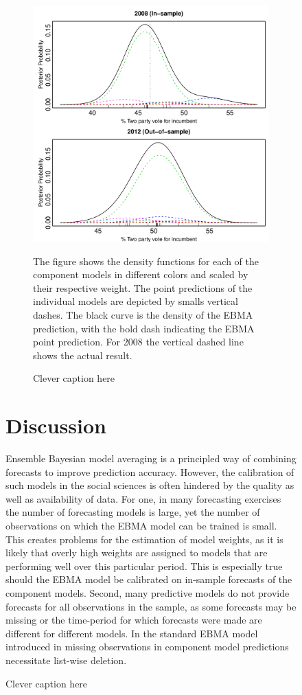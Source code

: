 \documentclass[12pt,fullpage,endnotes]{article}
\begin{document}
\begin{figure}[h]
\begin{figure}[h]
\caption{Clever caption here}
\label{pres}
\begin{center}
\includegraphics[scale=.8]{presForecast}
\end{center}
The figure shows the density functions for each of the component
models in different colors and scaled by their respective weight. The
point predictions of the individual models are depicted by smalls
vertical dashes. The black curve is the density of the EBMA
prediction, with the bold dash indicating the EBMA point
prediction. For 2008 the vertical dashed line shows the actual result.
\end{figure}


\section{Discussion} 
Ensemble Bayesian model averaging is a principled way of combining forecasts to improve prediction accuracy. However, the calibration of such models in the social sciences is often hindered by the quality as well as availability of data. For one, in many forecasting exercises the number of forecasting models is large, yet the number of observations on which the EBMA model can be trained is small. This creates problems for the estimation of model weights, as it is likely that overly high weights are assigned to models that are performing well over this particular period. This is especially true should the EBMA model be calibrated on in-sample forecasts of the component models. Second, many predictive models do not provide forecasts for all observations in the sample, as some forecasts may be missing or the time-period for which forecasts were made are different for different models. In the standard EBMA model introduced in \citet{mhw:2012} missing observations in component model predictions necessitate list-wise deletion. 


\end{figure}
\end{document}
